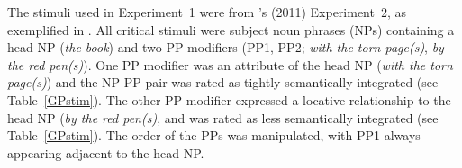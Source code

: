 \documentclass[12pt,titlepage]{article}
\begin{document}

The stimuli used in Experiment~1 were from \citeauthor{GillespiePearlmutter11}'s (2011) Experiment~2, as exemplified in . All critical stimuli were subject noun phrases (NPs) containing a head NP (\textit{the book}) and two PP modifiers (PP1, PP2; \textit{with the torn page(s)}, \textit{by the red pen(s)}). One PP modifier was an attribute of the head NP (\textit{with the torn page(s)}) and the NP PP pair was rated as tightly semantically integrated (see Table~\ref{GPstim}). The other PP modifier expressed a locative relationship to the head NP (\textit{by the red pen(s)}, and was rated as less semantically integrated (see Table~\ref{GPstim}). The order of the PPs was manipulated, with PP1 always appearing adjacent to the head NP.
\end{document}
